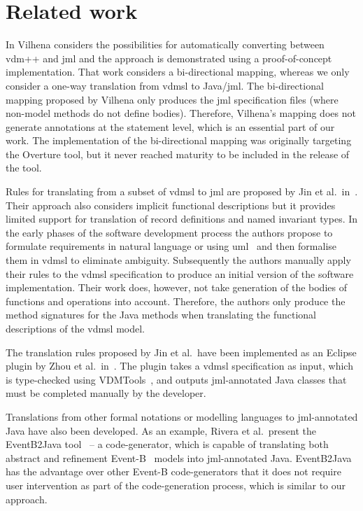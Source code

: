 
\section{Related work}
\label{sec:related}


In \cite{Vilhena08} Vilhena considers the possibilities for
automatically converting between \ac{vdm}++ and \ac{jml} and the
approach is demonstrated using a proof-of-concept implementation.
That work considers a bi-directional mapping, whereas we only consider
a one-way translation from \ac{vdmsl} to Java/\ac{jml}. The
bi-directional mapping proposed by Vilhena only produces the \ac{jml}
specification files (where non-model methods do not define
bodies). Therefore, Vilhena's mapping does not generate annotations at
the statement level, which is an essential part of our work. The
implementation of the bi-directional mapping was originally targeting
the Overture tool, but it never reached maturity to be included in the
release of the tool.

Rules for translating from a subset of \ac{vdmsl} to \ac{jml} are
proposed by Jin et al.\ in~\cite{Jin&08}. Their approach also
considers implicit functional descriptions but it provides limited
support for translation of record definitions and named invariant
types. In the early phases of the software development process the
authors propose to formulate requirements in natural language or using
\ac{uml}~\cite{Rumbaugh&04} and then formalise them in \ac{vdmsl} to
eliminate ambiguity. Subsequently the authors manually apply their
rules to the \ac{vdmsl} specification to produce an initial version of
the software implementation. Their work does, however, not take
generation of the bodies of functions and operations into
account. Therefore, the authors only produce the method signatures for
the Java methods when translating the functional descriptions of the
\ac{vdmsl} model.

The translation rules proposed by Jin et al.\ have been implemented as
an Eclipse plugin by Zhou et al.\ in~\cite{Zhou&10}. The plugin takes
a \ac{vdmsl} specification as input, which is type-checked using
VDMTools~\cite{Larsen01}, and outputs \ac{jml}-annotated Java classes
that must be completed manually by the developer.

Translations from other formal notations or modelling languages to
\ac{jml}-annotated Java have also been developed. As an example, Rivera et
al.\ present the EventB2Java tool~\cite{Rivera&15} -- a
code-generator, which is capable of translating both abstract and
refinement Event-B~\cite{Abrial09} models into \ac{jml}-annotated
Java. EventB2Java has the advantage over other Event-B code-generators
that it does not require user intervention as part of the
code-generation process, which is similar to our approach.

